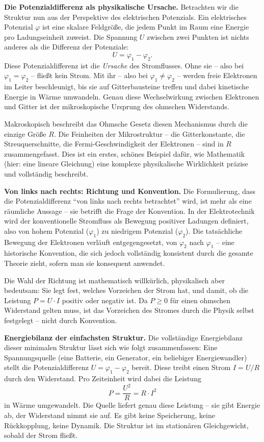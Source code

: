﻿\documentclass[12pt, a4paper]{article}
\begin{document}
	\textbf{Die Potenzialdifferenz als physikalische Ursache.}
	Betrachten wir die Struktur nun aus der Perspektive des elektrischen Potenzials. Ein elektrisches Potenzial $\varphi$ ist eine skalare Feldgröße, die jedem Punkt im Raum eine Energie pro Ladungseinheit zuweist. Die Spannung $U$ zwischen zwei Punkten ist nichts anderes als die Differenz der Potenziale:
	\begin{equation}
		U = \varphi_1 - \varphi_2.
		\label{eq:potential_diff}
	\end{equation}
	Diese Potenzialdifferenz ist die \textit{Ursache} des Stromflusses. Ohne sie -- also bei $\varphi_1 = \varphi_2$ -- fließt kein Strom. Mit ihr -- also bei $\varphi_1 \neq \varphi_2$ -- werden freie Elektronen im Leiter beschleunigt, bis sie auf Gitterbausteine treffen und dabei kinetische Energie in Wärme umwandeln. Genau diese Wechselwirkung zwischen Elektronen und Gitter ist der mikroskopische Ursprung des ohmschen Widerstands.

	Makroskopisch beschreibt das Ohmsche Gesetz diesen Mechanismus durch die einzige Größe $R$. Die Feinheiten der Mikrostruktur -- die Gitterkonstante, die Streuquerschnitte, die Fermi-Geschwindigkeit der Elektronen -- sind in $R$ zusammengefasst. Dies ist ein erstes, schönes Beispiel dafür, wie Mathematik (hier: eine lineare Gleichung) eine komplexe physikalische Wirklichkeit präzise und vollständig beschreibt.

	\textbf{Von links nach rechts: Richtung und Konvention.}
	Die Formulierung, dass die Potenzialdifferenz ``von links nach rechts betrachtet'' wird, ist mehr als eine räumliche Aussage -- sie betrifft die Frage der Konvention. In der Elektrotechnik wird der konventionelle Stromfluss als Bewegung positiver Ladungen definiert, also von hohem Potenzial ($\varphi_1$) zu niedrigem Potenzial ($\varphi_2$). Die tatsächliche Bewegung der Elektronen verläuft entgegengesetzt, von $\varphi_2$ nach $\varphi_1$ -- eine historische Konvention, die sich jedoch vollständig konsistent durch die gesamte Theorie zieht, sofern man sie konsequent anwendet.

	Die Wahl der Richtung ist mathematisch willkürlich, physikalisch aber bedeutsam: Sie legt fest, welches Vorzeichen der Strom hat, und damit, ob die Leistung $P = U \cdot I$ positiv oder negativ ist. Da $P \geq 0$ für einen ohmschen Widerstand gelten muss, ist das Vorzeichen des Stromes durch die Physik selbst festgelegt -- nicht durch Konvention.

	\textbf{Energiebilanz der einfachsten Struktur.}
	Die vollständige Energiebilanz dieser minimalen Struktur lässt sich wie folgt zusammenfassen: Eine Spannungsquelle (eine Batterie, ein Generator, ein beliebiger Energiewandler) stellt die Potenzialdifferenz $U = \varphi_1 - \varphi_2$ bereit. Diese treibt einen Strom $I = U/R$ durch den Widerstand. Pro Zeiteinheit wird dabei die Leistung
	\begin{equation}
		P = \frac{U^2}{R} = R \cdot I^2
	\end{equation}
	in Wärme umgewandelt. Die Quelle liefert genau diese Leistung -- sie gibt Energie ab, der Widerstand nimmt sie auf. Es gibt keine Speicherung, keine Rückkopplung, keine Dynamik. Die Struktur ist im stationären Gleichgewicht, sobald der Strom fließt.
\end{document}
